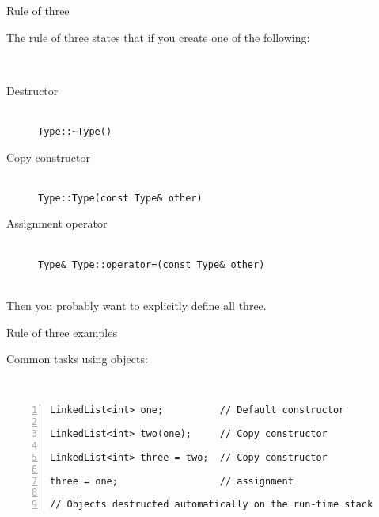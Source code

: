 \documentclass{beamer}
\begin{document}

\begin{frame}[fragile]{Rule of three}

The rule of three states that if you create one of the following: 

~\\

\begin{description}

\item[Destructor\ \ \ \ ] \hfill \\ %

\lstinline$Type::~Type()$

\item[Copy constructor] \hfill \\

\lstinline$Type::Type(const Type& other)$

\item[Assignment operator] \hfill \\

\lstinline$Type& Type::operator=(const Type& other)$

\end{description}

~\\

Then you probably want to explicitly define all three.

\end{frame}


\begin{frame}[fragile]{Rule of three examples}

Common tasks using objects:

~\\

\begin{lstlisting}[numbers=left]
LinkedList<int> one;          // Default constructor

LinkedList<int> two(one);     // Copy constructor

LinkedList<int> three = two;  // Copy constructor

three = one;                  // assignment

// Objects destructed automatically on the run-time stack
\end{lstlisting}

\end{frame}
\end{document}
